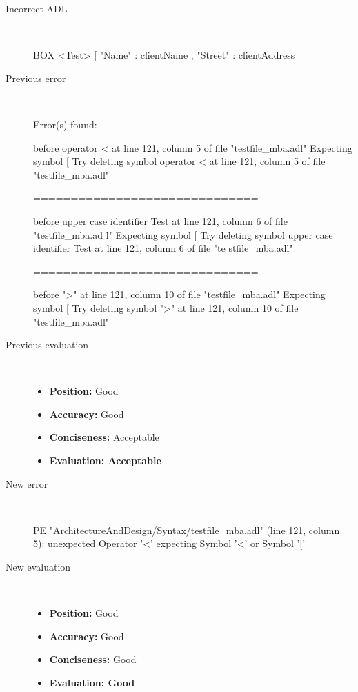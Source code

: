 \begin{description}
  \item[Incorrect ADL]~\\
\begin{adl}
BOX <Test> [ "Name"   : clientName
    , "Street" : clientAddress\end{adl}
  \item[Previous error]~\\
\begin{haskell}
Error(s) found:

before operator < at line 121, column 5 of file "testfile_mba.adl"
Expecting symbol [
Try deleting symbol operator < at line 121, column 5 of file "testfile_mba.adl"

==============================

before upper case identifier Test at line 121, column 6 of file "testfile_mba.ad
l"
Expecting symbol [
Try deleting symbol upper case identifier Test at line 121, column 6 of file "te
stfile_mba.adl"

==============================

before ">" at line 121, column 10 of file "testfile_mba.adl"
Expecting symbol [
Try deleting symbol ">" at line 121, column 10 of file "testfile_mba.adl"
\end{haskell}
  \item[Previous evaluation]~\\
    \begin{itemize}
    \item \textbf{Position:} Good
    \item \textbf{Accuracy:} Good
    \item \textbf{Conciseness:} Acceptable
    \item \textbf{Evaluation: Acceptable}
    \end{itemize}
  \item[New error]~\\
\begin{haskell}
PE "ArchitectureAndDesign/Syntax/testfile_mba.adl" (line 121, column 5):
unexpected Operator '<'
expecting Symbol '<' or Symbol '['
\end{haskell}
  \item[New evaluation]~\\
    \begin{itemize}
    \item \textbf{Position:} Good
    \item \textbf{Accuracy:} Good
    \item \textbf{Conciseness:} Good
    \item \textbf{Evaluation: Good}
    \end{itemize}
  \end{description}


